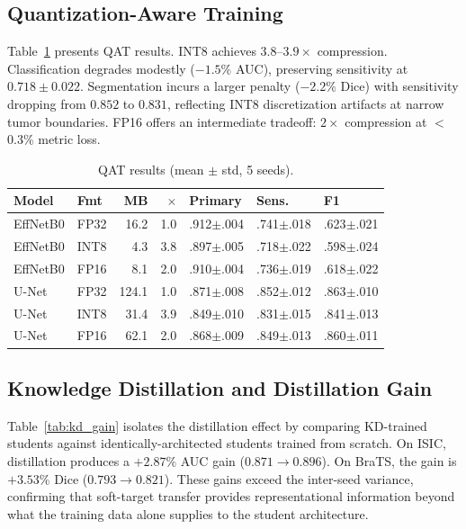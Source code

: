 \documentclass[10pt,twocolumn]{article}
\begin{document}
\subsection{Quantization-Aware Training}

Table~\ref{tab:qat} presents QAT results. INT8 achieves $3.8$--$3.9{\times}$ compression. Classification degrades modestly ($-1.5\%$ AUC), preserving sensitivity at $0.718{\pm}0.022$. Segmentation incurs a larger penalty ($-2.2\%$ Dice) with sensitivity dropping from $0.852$ to $0.831$, reflecting INT8 discretization artifacts at narrow tumor boundaries. FP16 offers an intermediate tradeoff: $2{\times}$ compression at $<$0.3\% metric loss.

\begin{table}[t]
\centering
\caption{QAT results (mean $\pm$ std, 5 seeds).}
\label{tab:qat}
\footnotesize
\setlength{\tabcolsep}{3pt}
\begin{tabular}{@{}llrrlll@{}}
\toprule
Model & Fmt & MB & $\times$ & Primary & Sens. & F1 \\
\midrule
EffNetB0 & FP32 & 16.2 & 1.0 & .912{\scriptsize$\pm$}.004 & .741{\scriptsize$\pm$}.018 & .623{\scriptsize$\pm$}.021 \\
EffNetB0 & INT8 & 4.3 & 3.8 & .897{\scriptsize$\pm$}.005 & .718{\scriptsize$\pm$}.022 & .598{\scriptsize$\pm$}.024 \\
EffNetB0 & FP16 & 8.1 & 2.0 & .910{\scriptsize$\pm$}.004 & .736{\scriptsize$\pm$}.019 & .618{\scriptsize$\pm$}.022 \\
\midrule
U-Net & FP32 & 124.1 & 1.0 & .871{\scriptsize$\pm$}.008 & .852{\scriptsize$\pm$}.012 & .863{\scriptsize$\pm$}.010 \\
U-Net & INT8 & 31.4 & 3.9 & .849{\scriptsize$\pm$}.010 & .831{\scriptsize$\pm$}.015 & .841{\scriptsize$\pm$}.013 \\
U-Net & FP16 & 62.1 & 2.0 & .868{\scriptsize$\pm$}.009 & .849{\scriptsize$\pm$}.013 & .860{\scriptsize$\pm$}.011 \\
\bottomrule
\end{tabular}
\end{table}

\subsection{Knowledge Distillation and Distillation Gain}

Table~\ref{tab:kd_gain} isolates the distillation effect by comparing KD-trained students against identically-architected students trained from scratch. On ISIC, distillation produces a $+2.87\%$ AUC gain ($0.871{\rightarrow}0.896$). On BraTS, the gain is $+3.53\%$ Dice ($0.793{\rightarrow}0.821$). These gains exceed the inter-seed variance, confirming that soft-target transfer provides representational information beyond what the training data alone supplies to the student architecture.
\end{document}
